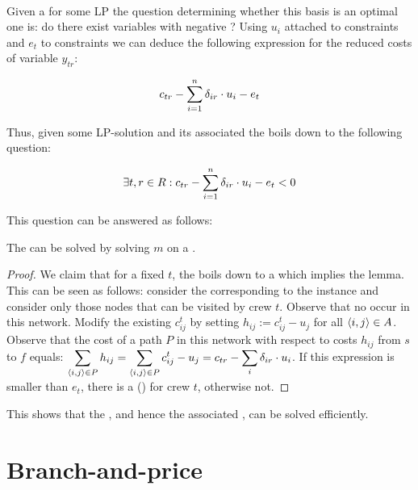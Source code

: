 \paragraph{}
Given a  for some LP the question determining whether this basis is an optimal one is: do there exist variables with negative ? Using  $u_i$ attached to constraints  and  $e_t$ to constraints  we can deduce the following expression for the reduced costs of variable $y_{tr}$:

\begin{equation}
c_{tr}-\sumieqb[i]{1}{n}{\delta_{ir}\cdot u_i-e_t}
\end{equation}

Thus, given some LP-solution and its associated  the  boils down to the following question:

\begin{equation}
\exists t,r\in R:c_{tr}-\sumieqb[i]{1}{n}{\delta_{ir}\cdot u_i-e_t}<0
\end{equation}

This question can be answered as follows:
\begin{lemma}
The  can be solved by solving $m$  on a .
\begin{proof}
We claim that for a fixed $t$, the  boils down to a  which implies the lemma. This can be seen as follows: consider the  corresponding to the instance and consider only those nodes that can be visited by crew $t$. Observe that no  occur in this network. Modify the existing  $c_{ij}^t$ by setting $h_{ij}:=c_{ij}^t-u_j$ for all $\tupl{i,j}\in A$. Observe that the cost of a path $P$ in this network with respect to costs $h_{ij}$ from $s$ to $f$ equals: $\sumdomain[\tupl{i,j}]{P}{h_{ij}}=\sumdomain[\tupl{i,j}]{P}{c_{ij}^t-u_j}=c_{tr}-\sum_i{\delta_{ir}\cdot u_i}$. If this expression is smaller than $e_t$, there is a  () for crew $t$, otherwise not.
\end{proof}
\end{lemma}
This shows that the , and hence the associated , can be solved efficiently.

\section{Branch-and-price}

